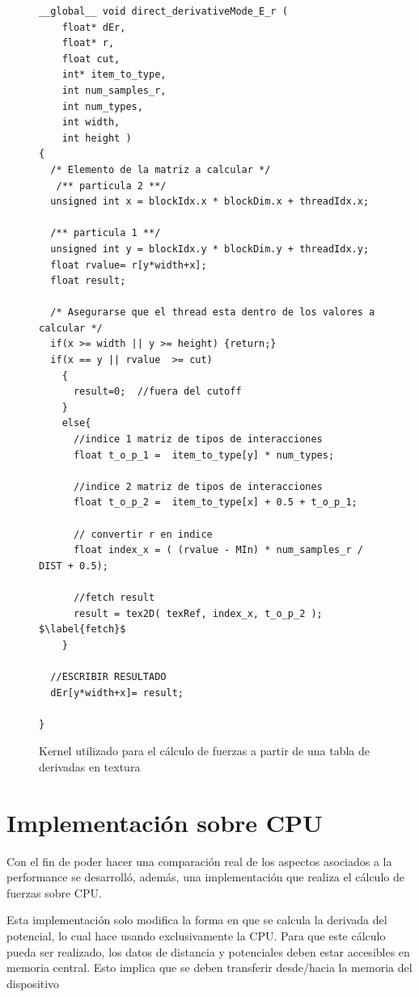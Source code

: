 \begin{figure}[htbp]
    \begin{lstlisting}
__global__ void direct_derivativeMode_E_r (
    float* dEr,
    float* r, 
    float cut, 
    int* item_to_type, 
    int num_samples_r, 
    int num_types, 
    int width, 
    int height )
{ 
  /* Elemento de la matriz a calcular */
   /** particula 2 **/
  unsigned int x = blockIdx.x * blockDim.x + threadIdx.x;
  
  /** particula 1 **/
  unsigned int y = blockIdx.y * blockDim.y + threadIdx.y;	
  float rvalue= r[y*width+x]; 
  float result;
  
  /* Asegurarse que el thread esta dentro de los valores a calcular */
  if(x >= width || y >= height) {return;}
  if(x == y || rvalue  >= cut) 
    {
      result=0;  //fuera del cutoff
    }
    else{
      //indice 1 matriz de tipos de interacciones
      float t_o_p_1 =  item_to_type[y] * num_types;	
      
      //indice 2 matriz de tipos de interacciones
      float t_o_p_2 =  item_to_type[x] + 0.5 + t_o_p_1;	
      
      // convertir r en indice
      float index_x = ( (rvalue - MIn) * num_samples_r / DIST + 0.5);	
     
      //fetch result
      result = tex2D( texRef, index_x, t_o_p_2 );     $\label{fetch}$
    }
   
  //ESCRIBIR RESULTADO 
  dEr[y*width+x]= result;

}
    \end{lstlisting}
    \caption{Kernel utilizado para el cálculo de fuerzas a partir de una tabla de derivadas en textura}
    \label{code:derivativesKernel}
\end{figure}



\section{Implementación sobre CPU}

Con el fin de poder hacer una comparación real de los aspectos asociados a la performance se desarrolló, además, una implementación que realiza el cálculo de fuerzas sobre CPU.

Esta implementación solo modifica la forma en que se calcula la derivada del potencial, lo cual hace usando exclusivamente la CPU. Para que este cálculo pueda ser realizado, los datos de distancia y potenciales deben
estar accesibles en memoria central. Esto implica que se deben transferir desde/hacia la memoria del dispositivo  
